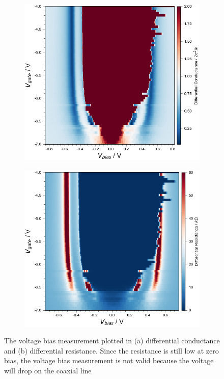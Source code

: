 \begin{figure}[h!]
    \centering
    \begin{subfigure}[b]{0.45\textwidth}
         \centering
         \includegraphics[width=1.1\textwidth]{Pic/KinkyVbiasCon.png}
         \caption{}
         \label{}
     \end{subfigure}
     \hfill
     \begin{subfigure}[b]{0.5\textwidth}
         \centering
         \includegraphics[width=\textwidth]{Pic/KinkyVbiasRes.png}
         \caption{}
         \label{}
     \end{subfigure}
    \caption{The voltage bias measurement plotted in (a) differential conductance and (b) differential resistance. Since the resistance is still low at zero bias, the voltage bias measurement is not valid because the voltage will drop on the coaxial line}
    \label{VbiasMSMT}
\end{figure}


